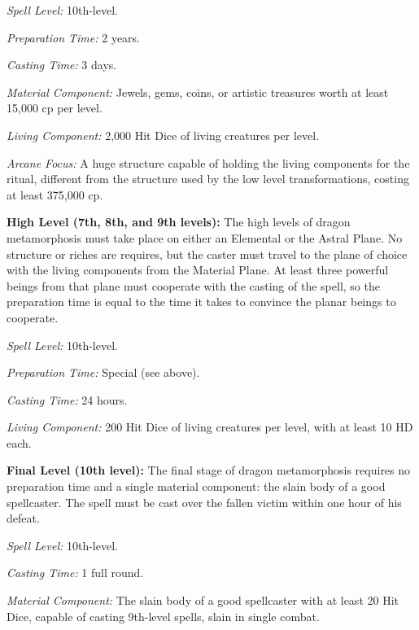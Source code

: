{\textit{Spell Level:} 10th-level.

\textit{Preparation Time:} 2 years.

\textit{Casting Time:} 3 days.

\textit{Material Component:} Jewels, gems, coins, or artistic treasures worth at least 15,000 cp per level.

\textit{Living Component:} 2,000 Hit Dice of living creatures per level.

\textit{Arcane Focus:} A huge structure capable of holding the living components for the ritual, different from the structure used by the low level transformations, costing at least 375,000 cp.

\textbf{High Level (7th, 8th, and 9th levels):} The high levels of dragon metamorphosis must take place on either an Elemental or the Astral Plane. No structure or riches are requires, but the caster must travel to the plane of choice with the living components from the Material Plane. At least three powerful beings from that plane must cooperate with the casting of the spell, so the preparation time is equal to the time it takes to convince the planar beings to cooperate.

\textit{Spell Level:} 10th-level.

\textit{Preparation Time:} Special (see above).

\textit{Casting Time:} 24 hours.

\textit{Living Component:} 200 Hit Dice of living creatures per level, with at least 10 HD each.

\textbf{Final Level (10th level):} The final stage of dragon metamorphosis requires no preparation time and a single material component: the slain body of a good spellcaster. The spell must be cast over the fallen victim within one hour of his defeat.

\textit{Spell Level:} 10th-level.

\textit{Casting Time:} 1 full round.

\textit{Material Component:} The slain body of a good spellcaster with at least 20 Hit Dice, capable of casting 9th-level spells, slain in single combat.

}
